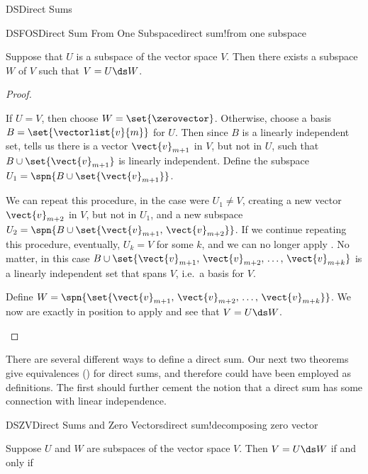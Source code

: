 \begin{subsect}{DS}{Direct Sums}
%
\begin{theorem}{DSFOS}{Direct Sum From One Subspace}{direct sum!from one subspace}
\begin{para}Suppose that $U$ is a subspace of the vector space $V$.  Then there exists a subspace $W$ of $V$ such that $V=U\ds W$.\end{para}
\end{theorem}
%
%
\begin{proof}
\begin{para}If $U=V$, then choose $W=\set{\zerovector}$.  Otherwise, choose a basis $B=\set{\vectorlist{v}{m}}$ for $U$.  Then since $B$ is a linearly independent set,  tells us there is a vector $\vect{v}_{m+1}$ in $V$, but not in $U$, such that $B\cup\set{\vect{v}_{m+1}}$ is linearly independent.  Define the subspace $U_1=\spn{B\cup\set{\vect{v}_{m+1}}}$.\end{para}
%
\begin{para}We can repeat this procedure, in the case were $U_1\neq V$, creating a new vector $\vect{v}_{m+2}$ in $V$, but not in $U_1$, and a new subspace $U_2=\spn{B\cup\set{\vect{v}_{m+1},\,\vect{v}_{m+2}}}$.  If we continue repeating this procedure, eventually, $U_k=V$ for some $k$, and we can no longer apply .  No matter, in this case $B\cup\set{\vect{v}_{m+1},\,\vect{v}_{m+2},\,\dots,\,\vect{v}_{m+k}}$ is a linearly independent set that spans $V$, i.e.\ a basis for $V$.\end{para}
%
\begin{para}Define $W=\spn{\set{\vect{v}_{m+1},\,\vect{v}_{m+2},\,\dots,\,\vect{v}_{m+k}}}$.  We now are exactly in position to apply  and see that $V=U\ds W$.\end{para}
\end{proof}
%
\begin{para}There are several different ways to define a direct sum.  Our next two theorems give equivalences () for direct sums, and therefore could have been employed as definitions.  The first should further cement the notion that a direct sum has some connection with linear independence.\end{para}
%
\begin{theorem}{DSZV}{Direct Sums and Zero Vectors}{direct sum!decomposing zero vector}
\begin{para}Suppose $U$ and $W$ are subspaces of the vector space $V$.  Then $V=U\ds W$ if and only if

\end{para}
\end{theorem}
\end{subsect}
